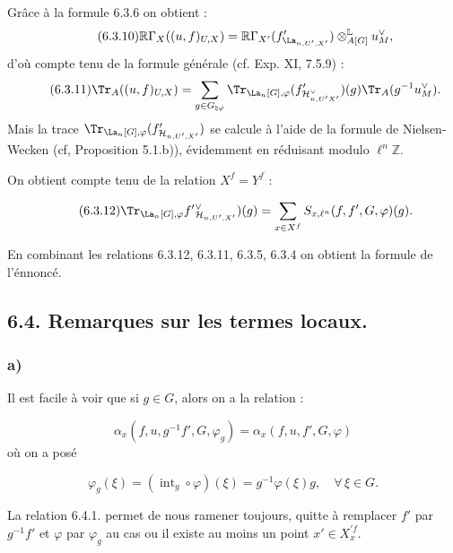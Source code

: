 Grâce à la formule 6.3.6 on obtient :
\begin{equation}
\tag{6.3.10}
\mathbb{R}\Gamma_X((u,f)_{U,X})=\mathbb{R}\Gamma_{X'}(f'_{\La_{n,U',X'}})\otimes_{A[G]}^{\mathbb{L}}u_M^\vee,
\end{equation}
d'où compte tenu de la formule générale (cf. Exp. XI, 7.5.9) :
\begin{equation}
\tag{6.3.11}
\Tr_A((u,f)_{U,X})=
\sum_{g\in G_{\natural\varphi}}\Tr_{\La_n[G],\varphi}(f'_{\mathcal{H}^\vee_{n,U'X'}})(g)\Tr_A(g^{-1}u_M^\vee).
\end{equation}
Mais la trace $\Tr_{\La_n[G],\varphi}(f'_{\mathcal{H}_{n,U',X'}})$ se calcule à l'aide de la formule de Nielsen-Wecken (cf, Proposition 5.1.b)), évidemment en réduisant modulo $\ell^n\mathbb{Z}$.

On
obtient compte tenu de la relation $X^f=Y^f$ :

\begin{equation}\tag{6.3.12}
\Tr_{\La_n[G],\varphi}f'{}^\vee_{\mathcal{H}_{n,U',X'}})(g)=\sum_{x\in X^f}S_{x,\ell^n}(f,f',G,\varphi)(g).
\end{equation}

En combinant les relations 6.3.12, 6.3.11, 6.3.5, 6.3.4 on obtient la formule de l'énnoncé.

\subsection*{6.4. Remarques sur les termes locaux.}
\subsubsection*{a)} Il est facile à voir que si $g\in G$, alors on a la relation :

\begin{equation}\tag{6.4.1}
\alpha_x(f,u,g^{-1}f',G,\varphi_g)=\alpha_x(f,u,f',G,\varphi)
\end{equation}
où on a posé

\begin{equation}\tag{6.4.2}
\varphi_g(\xi)=(\operatorname{int}_g\circ\varphi)(\xi)=g^{-1}\varphi(\xi)g,
\quad \forall\,\xi\in G.
\end{equation}

La relation 6.4.1. permet de nous ramener toujours, quitte à remplacer $f'$ par $g^{-1}f'$ et $\varphi$ par $\varphi_g$ au cas ou il existe au moins un point $x'\in X_x^{\prime f}$.

